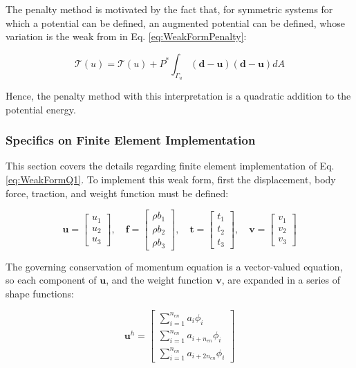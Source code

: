\documentclass[10pt]{article}
\begin{document}
The penalty method is motivated by the fact that, for symmetric systems for which a potential can be defined, an augmented potential can be defined, whose variation is the weak from in Eq. \eqref{eq:WeakFormPenalty}:

\begin{equation}
\mathscr{T}(u)=\mathscr{T}(u)+P^{*}\int_{\Gamma_u}(\textbf{d}-\textbf{u})(\textbf{d}-\textbf{u})dA
\end{equation}

Hence, the penalty method with this interpretation is a quadratic addition to the potential energy. 

\subsubsection{Specifics on Finite Element Implementation}

This section covers the details regarding finite element implementation of Eq. \eqref{eq:WeakFormQ1}. To implement this weak form, first the displacement, body force, traction, and weight function must be defined:

\begin{equation}
\textbf{u}=\begin{bmatrix}u_1\\u_2\\u_3\end{bmatrix},\quad\textbf{f}=\begin{bmatrix}\rho b_1\\\rho b_2\\\rho b_3\end{bmatrix},\quad\textbf{t}=\begin{bmatrix}t_1\\t_2\\t_3\end{bmatrix},\quad\textbf{v}=\begin{bmatrix}v_1\\v_2\\v_3\end{bmatrix}
\end{equation}

The governing conservation of momentum equation is a vector-valued equation, so each component of \(\textbf{u}\), and the weight function \(\textbf{v}\), are expanded in a series of shape functions:

\begin{equation}
\label{eq:UExpansion}
\textbf{u}^h=\begin{bmatrix}\sum_{i=1}^{n_{en}}a_i\phi_i\\\sum_{i=1}^{n_{en}}a_{i+n_{en}}\phi_i\\\sum_{i=1}^{n_{en}}a_{i+2n_{en}}\phi_i\end{bmatrix}
\end{equation}
\end{document}
